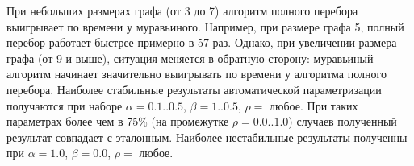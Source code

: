 При небольших размерах графа (от 3 до 7) алгоритм полного перебора выигрывает по времени у муравьиного. Например, при размере графа 5, полный перебор работает быстрее примерно в 57 раз. Однако, при увеличении размера графа (от 9 и выше), ситуация меняется в обратную сторону: муравьиный алгоритм начинает значительно выигрывать по времени у алгоритма полного перебора. 
Наиболее стабильные результаты автоматической параметризации получаются при наборе $\alpha = 0.1..0.5$, $\beta = 1..0.5$, $\rho = $ любое. При таких параметрах более чем в 75\% (на промежутке $\rho = 0.0..1.0$) случаев полученный результат совпадает с эталонным. Наиболее нестабильные результаты полученны при $\alpha = 1.0$, $\beta = 0.0$, $\rho = $ любое.


